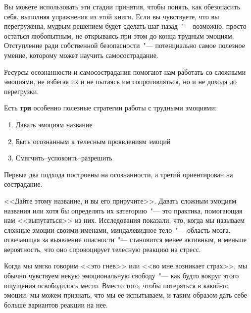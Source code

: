 Вы можете использовать эти стадии принятия, чтобы понять, как обезопасить себя, выполняя упражнения из этой книги. Если вы чувствуете, что вы перегружены, мудрым решением будет сделать шаг назад~"--- возможно, просто остаться любопытным, не открываясь при этом до конца трудным эмоциям. Отступление ради собственной безопасности~"--- потенциально самое полезное умение, которому может научить самосострадание.

Ресурсы осознанности и самосострадания помогают нам работать со сложными эмоциями, не избегая их и не пытаясь им сопротивляться, но и не доходя до перегрузки. 

\vspace{2ex}

Есть \textbf{три} особенно полезные стратегии работы с трудными эмоциями:
\begin{enumerate}
	\item Давать эмоциям название
	\item Быть осознанным к телесным проявлениям эмоций
	\item Смягчить--успокоить--разрешить
\end{enumerate} 

Первые два подхода построены на осознанности, а третий ориентирован на сострадание. 

\vspace{3ex}


\vspace{1ex}

<<Дайте этому название, и вы его приручите>>. Давать сложным эмоциям названия или хотя бы определять их категорию~"--- это практика, помогающая нам <<выпутаться>> из них. Исследования показали, что, когда мы называем сложные эмоции своими именами, миндалевидное тело~"--- область мозга, отвечающая за выявление опасности~"--- становится менее активным, и меньше вероятность, что оно спровоцирует телесную реакцию на стресс.

Когда мы мягко говорим <<это гнев>> или <<во мне возникает страх>>, мы обычно чувствуем некую эмоциональную свободу~"--- как будто вокруг этого ощущения освободилось место. Вместо того, чтобы потеряться в какой-то эмоции, мы можем признать, что мы ее испытываем, и таким образом дать себе больше вариантов реакции на нее.

\vspace{3ex}



